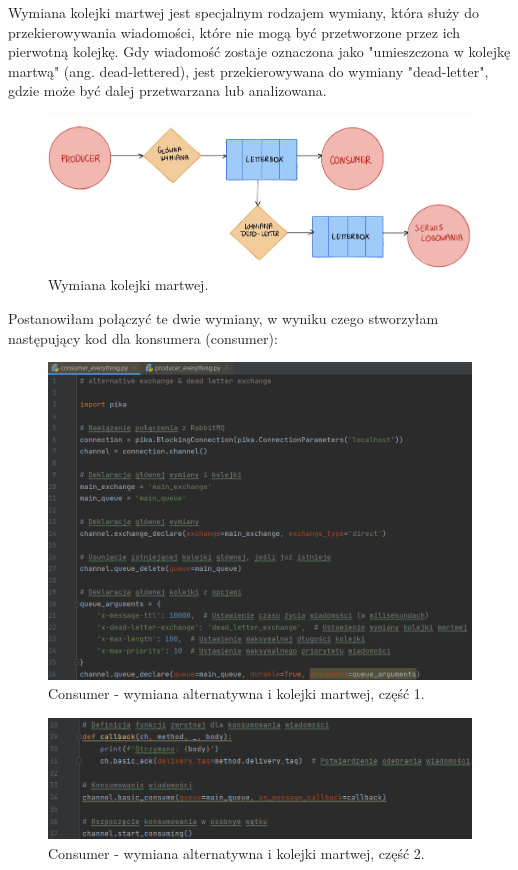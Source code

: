 \documentclass[12pt,twoside]{article}
\begin{document}
Wymiana kolejki martwej jest specjalnym rodzajem wymiany, która służy do przekierowywania wiadomości, które nie mogą być przetworzone przez ich pierwotną kolejkę. Gdy wiadomość zostaje oznaczona jako "umieszczona w kolejkę martwą" (ang. dead-lettered), jest przekierowywana do wymiany "dead-letter", gdzie może być dalej przetwarzana lub analizowana.

\begin{figure}[!htb]
	\centering
	\includegraphics[width=1\textwidth]{figures/fig11.png}
	\caption{Wymiana kolejki martwej.}
	\label{fig:zdjecie}
\end{figure}
\clearpage

Postanowiłam połączyć te dwie wymiany, w wyniku czego stworzyłam następujący kod dla konsumera  (consumer):


\begin{figure}[!htb]
	\centering
	\includegraphics[width=1\textwidth]{figures/fig12}
	\caption{Consumer - wymiana alternatywna i kolejki martwej, część 1.}
	\label{fig:zdjecie}
\end{figure}

\begin{figure}[!htb]
	\centering
	\includegraphics[width=1\textwidth]{figures/fig13}
	\caption{Consumer - wymiana alternatywna i kolejki martwej, część 2.}
	\label{fig:zdjecie}
\end{figure}
\end{document}
